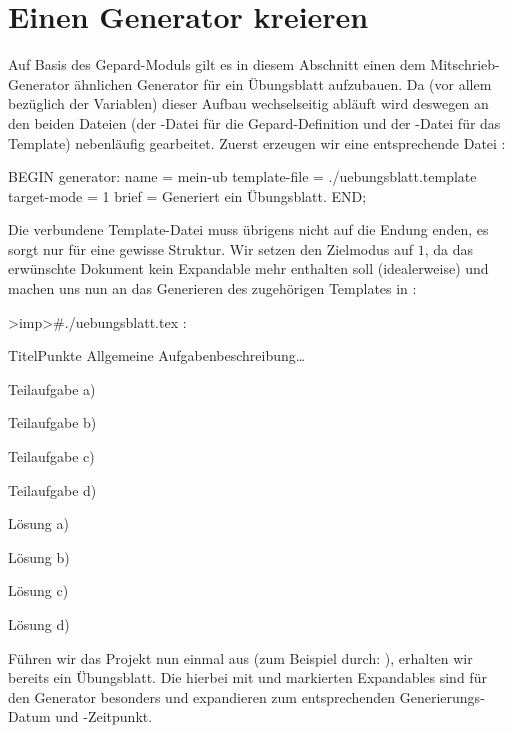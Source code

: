 \section{Einen Generator kreieren}
Auf Basis des Gepard-Moduls  gilt es in diesem Abschnitt einen dem Mitschrieb-Generator ähnlichen Generator für ein Übungsblatt aufzubauen. Da (vor allem bezüglich der Variablen) dieser Aufbau wechselseitig abläuft wird deswegen an den beiden Dateien (der -Datei für die Gepard-Definition und der -Datei für das Template) nebenläufig gearbeitet. Zuerst erzeugen wir eine entsprechende Datei :
\begin{gepard}
BEGIN generator:
    name                   = mein-ub
    template-file          = ./uebungsblatt.template
    target-mode            = 1
    brief                  = Generiert ein Übungsblatt.
END;
\end{gepard}
Die verbundene Template-Datei muss übrigens nicht auf die Endung  enden, es sorgt nur für eine gewisse Struktur. Wir setzen den Zielmodus auf $1$, da das erwünschte Dokument kein Expandable mehr enthalten soll (idealerweise) und machen uns nun an das Generieren des zugehörigen Templates in :
\begin{gepard}
>imp>#./uebungsblatt.tex
:
\begin{aufgabe}{Titel}{Punkte}
    Allgemeine Aufgabenbeschreibung\ldots
    \begin{aufgaben}[!**!2!**!]
        \item Teilaufgabe a)
        \item Teilaufgabe b)
        \item Teilaufgabe c)
        \item Teilaufgabe d)
    \end{aufgaben}
\vSplitter
    \begin{aufgaben}
        \item Lösung a)
        \item Lösung b)
        \item Lösung c)
        \item Lösung d)
    \end{aufgaben}
\end{aufgabe}
\end{gepard}
Führen wir das Projekt nun einmal aus (zum Beispiel durch: ), erhalten wir bereits ein Übungsblatt. Die hierbei mit  und  markierten Expandables sind für den Generator besonders und expandieren zum entsprechenden Generierungs-Datum und -Zeitpunkt.
